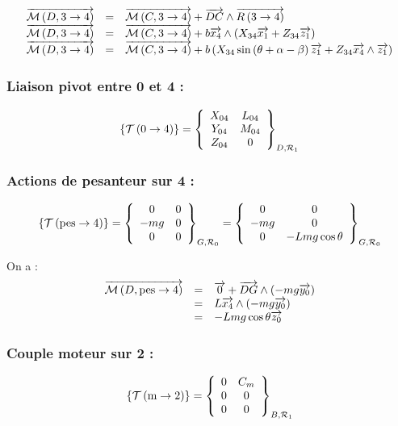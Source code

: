 \documentclass[10pt,fleqn]{article} %
\begin{document}
$$
\begin{array}{lcl}
\vectm{D}{3}{4} &=& \vectm{C}{3}{4} + \vect{DC} \wedge \vectf{3}{4} \\
\vectm{D}{3}{4} &=& \vectm{C}{3}{4} + b\vect{x_4} \wedge \left( X_{34} \vect{x_1}  +Z_{34} \vect{z_1}  \right)  \\
\vectm{D}{3}{4} &=& \vectm{C}{3}{4} + b \left( X_{34} \sin \left(\theta + \alpha -\beta\right) \vect{z_1}+Z_{34} \vect{x_4} \wedge\vect{z_1}  \right)  \\
\end{array}
$$

 
 
 
\subsubsection*{Liaison pivot entre 0 et 4 :}
$$
\torseurstat{T}{0}{4}=\torseurcol{X_{04}}{Y_{04}}{Z_{04}}{L_{04}}{M_{04}}{0}{D,\mathcal{R}_1}
$$

\subsubsection*{Actions de pesanteur sur 4 :}
$$
\torseurstat{T}{\text{pes}}{4}
=\torseurcol{0}{-mg}{0}{0}{0}{0}{G,\mathcal{R}_0}
=\torseurcol{0}{-mg}{0}{0}{0}{-Lmg \cos \theta }{G,\mathcal{R}_0}
$$



On a :
$$
\begin{array}{lcl}
\vectm{D}{\text{pes}}{4} &=& \vect{0} + \vect{DG} \wedge \left( -mg\vect{y_0}\right) \\
&=& L\vect{x_4} \wedge \left( -mg\vect{y_0}\right) \\
&=& -Lmg \cos \theta \vect{z_0} \\
\end{array}
$$


\subsubsection*{Couple moteur sur 2 :}
$$
\torseurstat{T}{\text{m}}{2}=\torseurcol{0}{0}{0}{C_m}{0}{0}{B,\mathcal{R}_1}
$$
\end{document}
